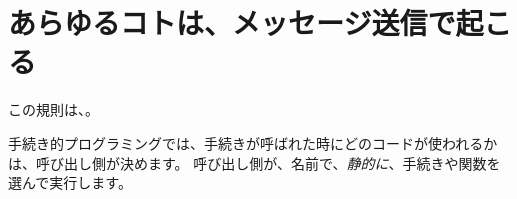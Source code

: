 \documentclass[a4paper,10pt,twoside]{book}
\begin{document}
\section{あらゆるコトは、メッセージ送信で起こる}


この規則は、。

手続き的プログラミングでは、手続きが呼ばれた時にどのコードが使われるかは、呼び出し側が決めます。
呼び出し側が、名前で、\emph{静的に}、手続きや関数を選んで実行します。
\end{document}
